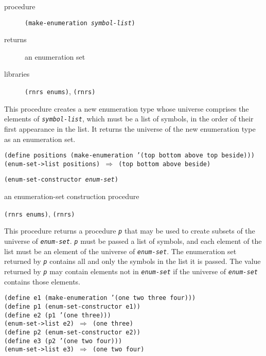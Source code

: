 \begin{description}

\label{objects_s291}\item[procedure] \texttt{(make-enumeration \textit{symbol-list})}



\item[returns] an enumeration set


\item[libraries] \texttt{(rnrs enums)}, \texttt{(rnrs)}
\end{description}


This procedure creates a new enumeration type whose universe comprises
the elements of \texttt{\textit{symbol-list}}, which must be
a list of symbols, in the order of their first appearance in the list.
It returns the universe of the new enumeration type as an enumeration
set.


\begin{alltt}
(define positions (make-enumeration '(top bottom above top beside)))
(enum-set-\textgreater{}list positions) \(\Rightarrow\) (top bottom above beside)
\end{alltt}

\begin{description}

\label{objects_s292}\item[procedure] \texttt{(enum-set-constructor \textit{enum-set})}



\item[returns] an enumeration-set construction procedure


\item[libraries] \texttt{(rnrs enums)}, \texttt{(rnrs)}
\end{description}


This procedure returns a procedure \texttt{\textit{p}} that may be used to create
subsets of the universe of \texttt{\textit{enum-set}}.
\texttt{\textit{p}} must be passed a list of symbols, and each element of the list
must be an element of the universe of \texttt{\textit{enum-set}}.
The enumeration set returned by \texttt{\textit{p}} contains all and only the
symbols in the list it is passed.
The value returned by \texttt{\textit{p}} may contain elements not in \texttt{\textit{enum-set}}
if the universe of \texttt{\textit{enum-set}} contains those elements.


\begin{alltt}
(define e1 (make-enumeration '(one two three four)))
(define p1 (enum-set-constructor e1))
(define e2 (p1 '(one three)))
(enum-set-\textgreater{}list e2) \(\Rightarrow\) (one three)
(define p2 (enum-set-constructor e2))
(define e3 (p2 '(one two four)))
(enum-set-\textgreater{}list e3) \(\Rightarrow\) (one two four)
\end{alltt}

